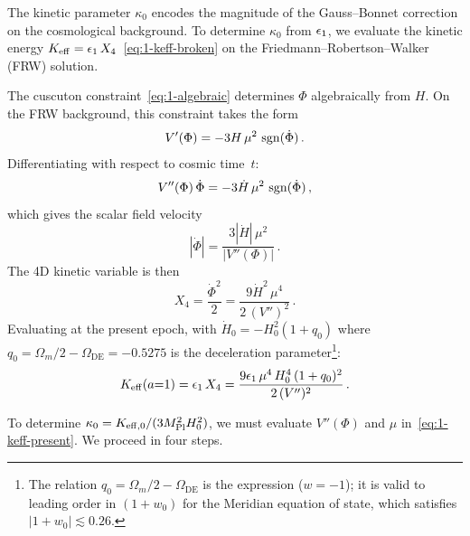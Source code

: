 The kinetic parameter $\kappa_0$ encodes the magnitude of the Gauss--Bonnet correction on the cosmological background. To determine $\kappa_0$ from $\epsilon_1$, we evaluate the kinetic energy $K_{\mathrm{eff}} = \epsilon_1\, X_4$~\eqref{eq:1-keff-broken} on the Friedmann--Robertson--Walker (FRW) solution.

The cuscuton constraint~\eqref{eq:1-algebraic} determines $\Phi$ algebraically from $H$. On the FRW background, this constraint takes the form
\begin{equation}
\label{eq:1-frw-constraint}
V'(\Phi) = -3H\,\mu^2\,\operatorname{sgn}(\dot\Phi)\,.
\end{equation}
Differentiating with respect to cosmic time~$t$:
\begin{equation}
\label{eq:1-frw-constraint-dot}
V''(\Phi)\,\dot\Phi = -3\dot{H}\,\mu^2\,\operatorname{sgn}(\dot\Phi)\,,
\end{equation}
which gives the scalar field velocity
\begin{equation}
\label{eq:1-phidot}
|\dot\Phi| = \frac{3|\dot{H}|\,\mu^2}{|V''(\Phi)|}\,.
\end{equation}
The 4D kinetic variable is then
\begin{equation}
\label{eq:1-X4}
X_4 = \frac{\dot\Phi^2}{2} = \frac{9\dot{H}^2\,\mu^4}{2\,(V'')^2}\,.
\end{equation}
Evaluating at the present epoch, with $\dot{H}_0 = -H_0^2(1+q_0)$ where $q_0 = \Omega_m/2 - \Omega_{\mathrm{DE}} = -0.5275$ is the deceleration parameter\footnote{The relation $q_0 = \Omega_m/2 - \Omega_{\mathrm{DE}}$ is the \LCDM{} expression ($w = -1$); it is valid to leading order in $(1 + w_0)$ for the Meridian equation of state, which satisfies $|1 + w_0| \lesssim 0.26$.}:
\begin{equation}
\label{eq:1-keff-present}
K_{\mathrm{eff}}(a{=}1) = \epsilon_1\, X_4 = \frac{9\epsilon_1\,\mu^4\, H_0^4\,(1+q_0)^2}{2\,(V'')^2}\,.
\end{equation}

To determine $\kappa_0 = K_{\mathrm{eff},0}/(3M_{\mathrm{Pl}}^2 H_0^2)$, we must evaluate $V''(\Phi)$ and $\mu$ in~\eqref{eq:1-keff-present}. We proceed in four steps.

